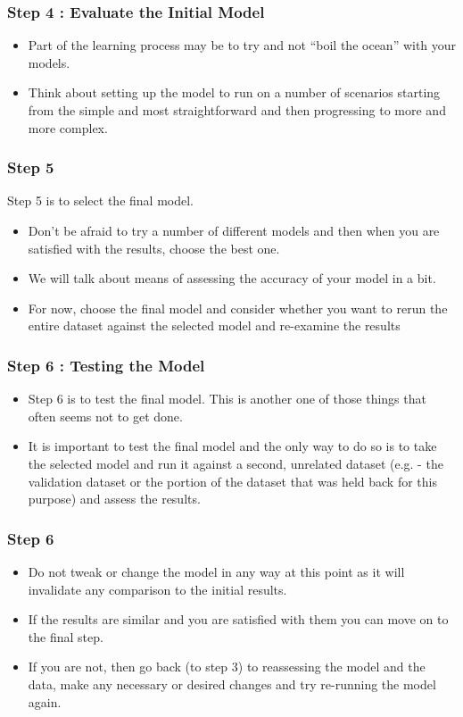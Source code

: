 \documentclass[PredictiveAnalytics101.tex]{subfiles}
\begin{document}
\begin{frame}
\frametitle{Step 4 : Evaluate the Initial Model}
\Large
\begin{itemize}
\item Part of the learning process may be to try and not “boil the ocean” with your models.
\item Think about
setting up the model to run on a number of scenarios starting from the simple and most straightforward
and then progressing to more and more complex.
\end{itemize}

\end{frame}
\begin{frame}
\frametitle{Step 5} 
Step 5 is to select the final model.
\begin{itemize}
\item Don’t be afraid to try a number of different models and then when
you are satisfied with the results, choose the best one.
\item  We will talk about means of assessing the
accuracy of your model in a bit.
\item For now, choose the final model and consider whether you want to rerun
the entire dataset against the selected model and re-examine the results
\end{itemize} 
\end{frame}
\begin{frame}
\frametitle{Step 6 : Testing the Model}
\begin{itemize}
\item Step 6 is to test the final model. This is another one of those things that often seems not to get done.
\item It is important to test the final model and the only way to do so is to take the selected model and run it
against a second, unrelated dataset (e.g. - the validation dataset or the portion of the dataset that was
held back for this purpose) and assess the results.
\end{itemize}

\end{frame}
\begin{frame}
	\frametitle{Step 6}
	\Large
\begin{itemize}
\item Do not tweak or change the model in any way at this
point as it will invalidate any comparison to the initial results. 
\item If the results are similar and you are
satisfied with them you can move on to the final step. 
\item If you are not, then go back (to step 3) to
reassessing the model and the data, make any necessary or desired changes and try re-running the
model again.
\end{itemize}

\end{frame}
\end{document}
